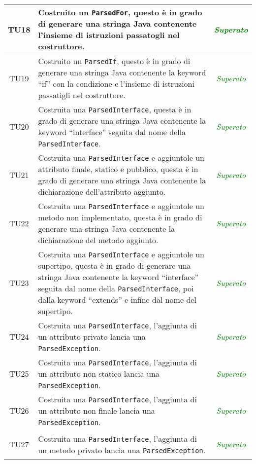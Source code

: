 \begin{longtable}{|c|>{}m{8cm}|c|}
\hypertarget{TU18}{TU18} & Costruito un \texttt{ParsedFor}, questo è in grado di generare una stringa Java contenente l'insieme di istruzioni passatogli nel costruttore. & \textcolor{Green}{\textit{Superato}}\\ \hline
\hypertarget{TU19}{TU19} & Costruito un \texttt{ParsedIf}, questo è in grado di generare una stringa Java contenente la keyword ``if'' con la condizione e l'insieme di istruzioni passatigli nel costruttore. & \textcolor{Green}{\textit{Superato}}\\ \hline
\hypertarget{TU20}{TU20} & Costruita una \texttt{ParsedInterface}, questa è in grado di generare una stringa Java contenente la keyword ``interface'' seguita dal nome della \texttt{ParsedInterface}. & \textcolor{Green}{\textit{Superato}}\\ \hline
\hypertarget{TU21}{TU21} & Costruita una \texttt{ParsedInterface} e aggiuntole un attributo finale, statico e pubblico, questa è in grado di generare una stringa Java contenente la dichiarazione dell'attributo aggiunto. & \textcolor{Green}{\textit{Superato}}\\ \hline
\hypertarget{TU22}{TU22} & Costruita una \texttt{ParsedInterface} e aggiuntole un metodo non implementato, questa è in grado di generare una stringa Java contenente la dichiarazione del metodo aggiunto. & \textcolor{Green}{\textit{Superato}}\\ \hline
\hypertarget{TU23}{TU23} & Costruita una \texttt{ParsedInterface} e aggiuntole un supertipo, questa è in grado di generare una stringa Java contenente la keyword ``interface'' seguita dal nome della \texttt{ParsedInterface}, poi dalla keyword ``extends'' e infine dal nome del supertipo. & \textcolor{Green}{\textit{Superato}}\\ \hline
\hypertarget{TU24}{TU24} & Costruita una \texttt{ParsedInterface}, l'aggiunta di un attributo privato lancia una \texttt{ParsedException}. & \textcolor{Green}{\textit{Superato}}\\ \hline
\hypertarget{TU25}{TU25} & Costruita una \texttt{ParsedInterface}, l'aggiunta di un attributo non statico lancia una \texttt{ParsedException}. & \textcolor{Green}{\textit{Superato}}\\ \hline
\hypertarget{TU26}{TU26} & Costruita una \texttt{ParsedInterface}, l'aggiunta di un attributo non finale lancia una \texttt{ParsedException}. & \textcolor{Green}{\textit{Superato}}\\ \hline
\hypertarget{TU27}{TU27} & Costruita una \texttt{ParsedInterface}, l'aggiunta di un metodo privato lancia una \texttt{ParsedException}. & \textcolor{Green}{\textit{Superato}}\\ \hline

\end{longtable}
